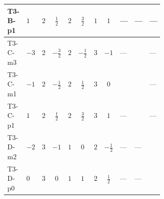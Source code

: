 \documentclass[8pt]{article}
\begin{document}
\begin{landscape}
\begin{longtable}{@{}llcccccc >{\raggedright\arraybackslash}p{0.21\linewidth} >{\raggedright\arraybackslash}p{0.21\linewidth} >{\raggedright\arraybackslash}p{0.21\linewidth}@{}}
\midrule
T3-B-p1 & $1$ & $2$ & $\frac{1}{2}$ & $2$ & $\frac{3}{2}$ & $1$ & $1$ & --- & --- & --- \\
\midrule
T3-C-m3 & $-3$ & $2$ & $-\frac{3}{2}$ & $2$ & $-\frac{1}{2}$ & $3$ & $-1$ & --- & \scriptsize\adjustbox{max width=\linewidth}{$\begin{gathered} {\lambda_{HS_2}^{(1)}} (3 T_{\nu}^{(2)}+6 \operatorname{Tr}\!\left({Y_d}\,\left({Y_d}\right)^{\dagger}\right)+2 \operatorname{Tr}\!\left({Y_e}\,\left({Y_e}\right)^{\dagger}\right)+6 \operatorname{Tr}\!\left({Y_u}\,\left({Y_u}\right)^{\dagger}\right))\end{gathered}$} & --- \\
\midrule
T3-C-m1 & $-1$ & $2$ & $-\frac{1}{2}$ & $2$ & $\frac{1}{2}$ & $3$ & $0$ & \scriptsize\adjustbox{max width=\linewidth}{$\begin{gathered} +24 {\lambda_{8}} \left({\lambda_{8}}\right)^{*}\end{gathered}$} & \scriptsize\adjustbox{max width=\linewidth}{$\begin{gathered} {\lambda_{HS_2}^{(1)}} (3 T_{\nu}^{(2)}+6 \operatorname{Tr}\!\left({Y_d}\,\left({Y_d}\right)^{\dagger}\right)+2 \operatorname{Tr}\!\left({Y_e}\,\left({Y_e}\right)^{\dagger}\right)+6 \operatorname{Tr}\!\left({Y_u}\,\left({Y_u}\right)^{\dagger}\right))\end{gathered}$} & --- \\
\midrule
T3-C-p1 & $1$ & $2$ & $\frac{1}{2}$ & $2$ & $\frac{3}{2}$ & $3$ & $1$ & --- & \scriptsize\adjustbox{max width=\linewidth}{$\begin{gathered} {\lambda_{HS_2}^{(1)}} (3 T_{\nu}^{(2)}+6 \operatorname{Tr}\!\left({Y_d}\,\left({Y_d}\right)^{\dagger}\right)+2 \operatorname{Tr}\!\left({Y_e}\,\left({Y_e}\right)^{\dagger}\right)+6 \operatorname{Tr}\!\left({Y_u}\,\left({Y_u}\right)^{\dagger}\right))\end{gathered}$} & --- \\
\midrule
T3-D-m2 & $-2$ & $3$ & $-1$ & $1$ & $0$ & $2$ & $-\frac{1}{2}$ & --- & --- & \scriptsize\adjustbox{max width=\linewidth}{$\begin{gathered} {\lambda_{HS_2}^{(1)}} (4 T_{\nu}^{(2)}+6 \operatorname{Tr}\!\left({Y_d}\,\left({Y_d}\right)^{\dagger}\right)+2 \operatorname{Tr}\!\left({Y_e}\,\left({Y_e}\right)^{\dagger}\right)+6 \operatorname{Tr}\!\left({Y_u}\,\left({Y_u}\right)^{\dagger}\right))\end{gathered}$} \\
\midrule
T3-D-p0 & $0$ & $3$ & $0$ & $1$ & $1$ & $2$ & $\frac{1}{2}$ & --- & --- & \scriptsize\adjustbox{max width=\linewidth}{$\begin{gathered} {\lambda_{HS_2}^{(1)}} (4 T_{\nu}^{(2)}+6 \operatorname{Tr}\!\left({Y_d}\,\left({Y_d}\right)^{\dagger}\right)+2 \operatorname{Tr}\!\left({Y_e}\,\left({Y_e}\right)^{\dagger}\right)+6 \operatorname{Tr}\!\left({Y_u}\,\left({Y_u}\right)^{\dagger}\right))\end{gathered}$} \\

\end{longtable}
\end{landscape}
\end{document}

